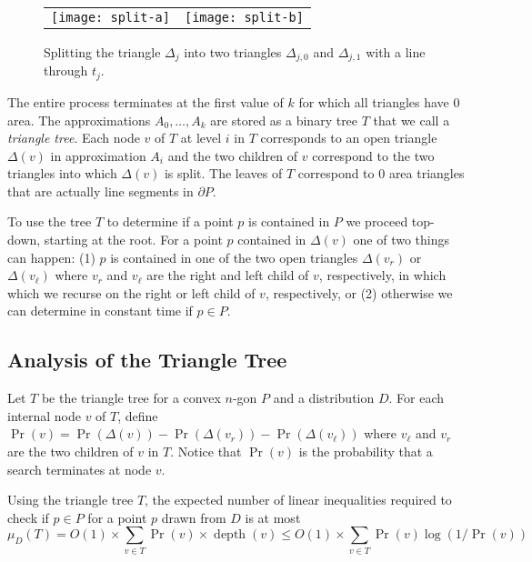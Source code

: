 \documentclass[charterfonts,lotsofwhite]{patmorin}
\newcommand{\boundary}{\partial}
\DeclareMathOperator{\depth}{depth}
\begin{document}
\begin{figure}
\begin{center}
\begin{tabular}{cc}
\texttt{[image: split-a]} & \texttt{[image: split-b]}
\end{tabular}
\end{center}
\caption{Splitting the triangle $\Delta_j$ into two triangles
$\Delta_{j,0}$ and $\Delta_{j,1}$ with a line through $t_j$.}
\end{figure}

The entire process terminates at the first value of $k$ for which all
triangles have 0 area.  The approximations $A_0,\ldots,A_k$ are stored
as a binary tree $T$ that we call a \emph{triangle tree}.  Each node
$v$ of $T$ at level $i$ in $T$ corresponds to an open triangle
$\Delta(v)$ in approximation $A_{i}$ and the two children of $v$
correspond to the two triangles into which $\Delta(v)$ is split.  The
leaves of $T$ correspond to 0 area triangles that are actually line
segments in $\boundary P$. 

To use the tree $T$ to determine if a point $p$ is contained in $P$ we
proceed top-down, starting at the root.  For a point $p$ contained in
$\Delta(v)$ one of two things can happen: (1) $p$ is contained in one
of the two open triangles $\Delta(v_r)$ or $\Delta(v_\ell)$ where
$v_r$ and $v_\ell$ are the right and left child of $v$, respectively,
in which which we recurse on the right or left child of $v$,
respectively, or (2) otherwise we can determine in constant time if
$p\in P$.

\subsection{Analysis of the Triangle Tree}

Let $T$ be the triangle tree for a convex $n$-gon $P$ and a
distribution $D$.  For each internal node $v$ of $T$, define
$\Pr(v)=\Pr(\Delta(v))-\Pr(\Delta(v_r))-\Pr(\Delta(v_\ell))$ where
$v_\ell$ and $v_r$ are the two children of $v$ in $T$.  Notice that
$\Pr(v)$ is the probability that a search terminates at node $v$.

\begin{thm}
Using the triangle tree $T$, the expected number of linear inequalities
required to check if $p\in P$ for a point $p$ drawn from $D$ is at
most
\[
     \mu_D(T) = O(1)\times \sum_{v\in T}\Pr(v)\times\depth (v)
      \le O(1)\times \sum_{v\in T}\Pr(v)\log(1/\Pr(v))
\]
\end{thm}
\end{document}
